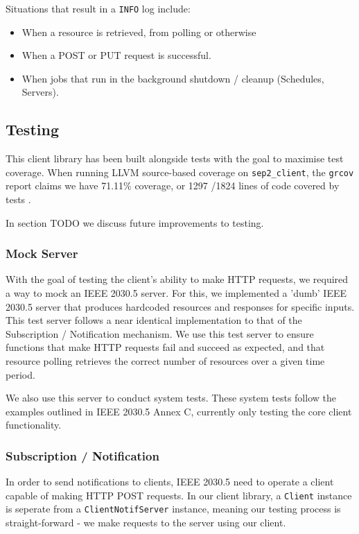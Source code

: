 Situations that result in a \texttt{INFO} log include:

\begin{itemize}
    \item When a resource is retrieved, from polling or otherwise
    \item When a POST or PUT request is successful.
    \item When jobs that run in the background shutdown / cleanup (Schedules, Servers).
\end{itemize}

\subsection{Testing}
This client library has been built alongside tests with the goal to maximise test coverage. When running LLVM source-based coverage on \texttt{sep2\_client}, the \texttt{grcov} report claims we have 71.11\% coverage, or 1297 \slash 1824 lines of code covered by tests \cite{grcov} \cite{llvmcov}. 

In section TODO we discuss future improvements to testing.

\subsubsection{Mock Server}
With the goal of testing the client's ability to make HTTP requests, we required a way to mock an IEEE 2030.5 server. For this, we implemented a 'dumb' IEEE 2030.5 server that produces hardcoded resources and responses for specific inputs. This test server follows a near identical implementation to that of the Subscription / Notification mechanism. We use this test server to ensure functions that make HTTP requests fail and succeed as expected, and that resource polling retrieves the correct number of resources over a given time period. 

We also use this server to conduct system tests. These system tests follow the examples outlined in IEEE 2030.5 Annex C, currently only testing the core client functionality.

\subsubsection{Subscription / Notification}
In order to send notifications to clients, IEEE 2030.5 need to operate a client capable of making HTTP POST requests. In our client library, a \texttt{Client} instance is seperate from a \texttt{ClientNotifServer} instance, meaning our testing process is straight-forward - we make requests to the server using our client. 

